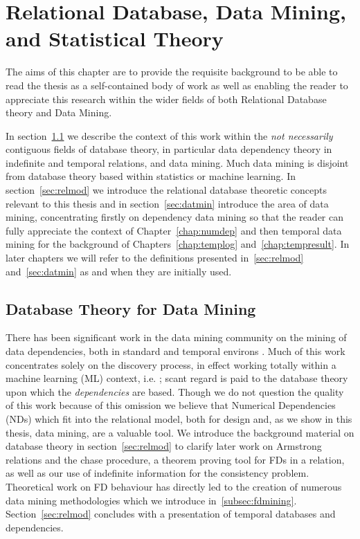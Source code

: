 \chapter{Relational Database, Data Mining, and Statistical
Theory}\label{chap:review}

The aims of this chapter are to provide the requisite
background to be able to read the thesis as a self-contained body of
work as well as enabling the reader to appreciate this research within
the wider fields of both Relational Database theory and Data Mining.

In section~\ref{sec:db_for_dm} we describe the context of this work
within the {\em not necessarily} contiguous fields of database theory,
in particular data dependency theory in indefinite and temporal
relations, and data mining. Much data mining is disjoint from database
theory based within statistics or machine learning.  
In section~\ref{sec:relmod} we introduce
the relational database theoretic
concepts relevant to this thesis and in section~\ref{sec:datmin}
introduce the area of data mining, concentrating firstly on dependency data
mining so that the reader can fully appreciate the context of
Chapter~\ref{chap:numdep} and then temporal data mining for the
background of Chapters~\ref{chap:templog} and~\ref{chap:tempresult}. In later chapters we will refer to
the definitions presented in~\ref{sec:relmod} and~\ref{sec:datmin}
as and when they are initially used.

\section{Database Theory for Data Mining}\label{sec:db_for_dm}

There has been significant work in the data mining community on the
mining of data dependencies, both in standard \cite{psm93,km95} and
temporal environs \cite{bwj96}. Much of this work concentrates solely
on the discovery process, in effect working totally within a machine
learning (ML) context, i.e. \cite{she91}; scant regard is paid to the
database theory upon which the {\em dependencies} are based. Though we
do not question the quality of this work because of this omission we
believe that Numerical Dependencies (NDs) which fit into the
relational model, both for design and, as we show in this thesis, data
mining, are a valuable tool. We introduce the background material on
database theory in section~\ref{sec:relmod} to clarify
later work on Armstrong relations and the chase procedure, a
theorem proving tool for FDs in a relation, as well as our use of indefinite
information for the consistency problem. Theoretical work on FD behaviour has directly led to the
creation of numerous data mining methodologies which we introduce
in~\ref{subsec:fdmining}.  Section~\ref{sec:relmod} concludes with a presentation of
temporal databases and dependencies.


